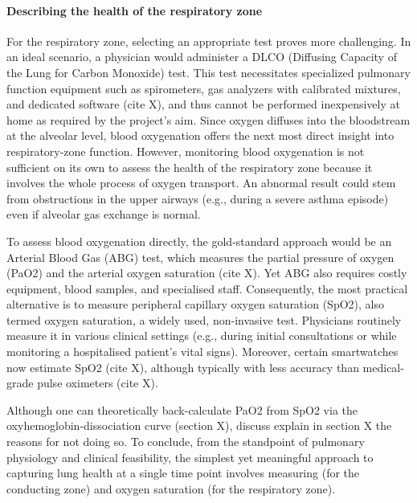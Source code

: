 \paragraph{Describing the health of the respiratory zone}
For the respiratory zone, selecting an appropriate test proves more challenging. In an ideal scenario, a physician would administer a DLCO (Diffusing Capacity of the Lung for Carbon Monoxide) test. This test necessitates specialized pulmonary function equipment such as spirometers, gas analyzers with calibrated mixtures, and dedicated software (cite X), and thus cannot be performed inexpensively at home as required by the project's aim. Since oxygen diffuses into the bloodstream at the alveolar level, blood oxygenation offers the next most direct insight into respiratory-zone function. However, monitoring blood oxygenation is not sufficient on its own to assess the health of the respiratory zone because it involves the whole process of oxygen transport. An abnormal result could stem from obstructions in the upper airways (e.g., during a severe asthma episode) even if alveolar gas exchange is normal.

To assess blood oxygenation directly, the gold-standard approach would be an Arterial Blood Gas (ABG) test, which measures the partial pressure of oxygen (PaO2) and the arterial oxygen saturation (cite X). Yet ABG also requires costly equipment, blood samples, and specialised staff. Consequently, the most practical alternative is to measure peripheral capillary oxygen saturation (SpO2), also termed oxygen saturation, a widely used, non-invasive test. Physicians routinely measure it in various clinical settings (e.g., during initial consultations or while monitoring a hospitalised patient’s vital signs). Moreover, certain smartwatches now estimate SpO2 (cite X), although typically with less accuracy than medical-grade pulse oximeters (cite X).

Although one can theoretically back-calculate PaO2 from SpO2 via the oxyhemoglobin-dissociation curve (section X), discuss explain in section X the reasons for not doing so. To conclude, from the standpoint of pulmonary physiology and clinical feasibility, the simplest yet meaningful approach to capturing lung health at a single time point involves measuring \F (for the conducting zone) and oxygen saturation (for the respiratory zone).


